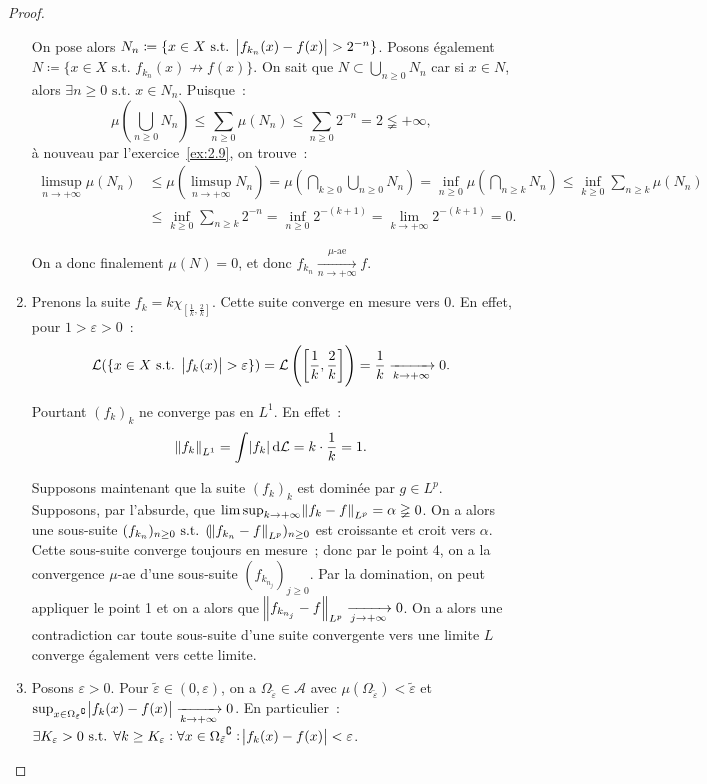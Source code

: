 \documentclass{article}
\newcommand{\pinfty}{{+\infty}}
\newcommand{\st}{\text{ s.t. }}
\newcommand{\C}{\complement}
\begin{document}
\begin{proof}
\begin{enumerate}
	On pose alors $N_n \coloneqq \{x \in X \st \abs {f_{k_n}(x)-f(x)} > 2^{-n}\}$. Posons également $N \coloneqq \{x \in X \st f_{k_n}(x) \not \to f(x)\}$. On sait
	que $N \subset \bigcup_{n \geq 0}N_n$ car si $x \in N$, alors $\exists n \geq 0 \st x \in N_n$. Puisque~:
	\[\mu\left(\bigcup_{n \geq 0}N_n\right) \leq \sum_{n \geq 0}\mu(N_n) \leq \sum_{n \geq 0}2^{-n} = 2 \lneqq \pinfty,\]
	à nouveau par l'exercice~\ref{ex:2.9}, on trouve~:
	\begin{align*}
		\limsup_{n \to \pinfty}\mu(N_n) &\leq \mu(\limsup_{n \to \pinfty}N_n) = \mu\left(\bigcap_{k \geq 0}\bigcup_{n \geq 0}N_n\right)
			= \inf_{n \geq 0}\mu\left(\bigcap_{n \geq k}N_n\right) \leq \inf_{k \geq 0}\sum_{n \geq k}\mu(N_n) \\
		&\leq \inf_{k \geq 0}\sum_{n \geq k}2^{-n} = \inf_{n \geq 0}2^{-(k+1)} = \lim_{k \to \pinfty}2^{-(k+1)} = 0.
	\end{align*}

	On a donc finalement $\mu(N) = 0$, et donc $f_{k_n} \xrightarrow[n \to \pinfty]{\mu\text{-ae}} f$.

	\item Prenons la suite $f_k = k\chi_{\left[\frac 1k, \frac 2k\right]}$. Cette suite converge en mesure vers $0$. En effet, pour $1 > \varepsilon > 0$~:
	\[\mathcal L(\{x \in X \st \abs {f_k(x)} > \varepsilon\}) = \mathcal L\left(\left[\frac 1k, \frac 2k\right]\right) = \frac 1k \xrightarrow[k \to \pinfty]{} 0.\]

	Pourtant $(f_k)_k$ ne converge pas en $L^1$. En effet~:
	\[\norm {f_k}_{L^1} = \int \abs {f_k}\dif\mathcal L = k \cdot \frac 1k = 1.\]

	Supposons maintenant que la suite $(f_k)_k$ est dominée par $g \in L^p$. Supposons, par l'absurde, que $\limsup_{k \to \pinfty}\norm {f_k-f}_{L^p} = \alpha \gneqq 0$.
	On a alors une sous-suite $(f_{k_n})_{n \geq 0} \st (\norm {f_{k_n}-f}_{L^p})_{n \geq 0}$ est croissante et croit vers $\alpha$.
	Cette sous-suite converge toujours en mesure~; donc par le point 4, on a la convergence $\mu$-ae d'une sous-suite $(f_{k_{n_j}})_{j \geq 0}$. Par la domination,
	on peut appliquer le point 1 et on a alors que $\norm {f_{k_{n_j}}-f}_{L^p} \xrightarrow[j \to \pinfty]{} 0$. On a alors une contradiction car toute sous-suite d'une
	suite convergente vers une limite $L$ converge également vers cette limite.


	\item Posons $\varepsilon > 0$. Pour $\tilde \varepsilon \in (0, \varepsilon)$, on a $\Omega_{\tilde \varepsilon} \in \mathcal A$ avec
	$\mu(\Omega_{\tilde \varepsilon}) < \tilde \varepsilon$ et $\sup_{x \in {\Omega_{\tilde \varepsilon}}^\C}\abs {f_k(x)-f(x)} \xrightarrow[k \to \pinfty]{} 0$.
	En particulier~: $\exists K_\varepsilon > 0 \st \forall k \geq K_\varepsilon : \forall x \in {\Omega_{\tilde \varepsilon}}^\C : \abs {f_k(x)-f(x)} < \varepsilon$.


\end{enumerate}
\end{proof}
\end{document}
